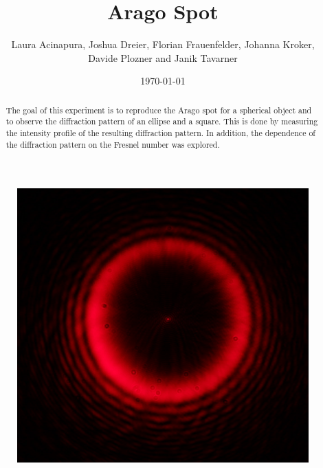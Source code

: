 \documentclass[11pt,a4paper]{article}
\title{Arago Spot}
\author{Laura Acinapura, Joshua Dreier, Florian Frauenfelder, Johanna Kroker, \\ Davide Plozner and Janik Tavarner}
\date{\today}
\begin{document}
\maketitle

\begin{figure}[h]
    \centering
    \includegraphics[width=0.5\linewidth]{images/cover-picture.png}
\end{figure}

\begin{abstract}
The goal of this experiment is to reproduce the Arago spot for a spherical object and to observe the diffraction pattern of an ellipse and a square. This is done by measuring the intensity profile of the resulting diffraction pattern. In addition, the dependence of the diffraction pattern on the Fresnel number was explored.
\end{abstract}



\vspace{0.75cm}
\end{document}
